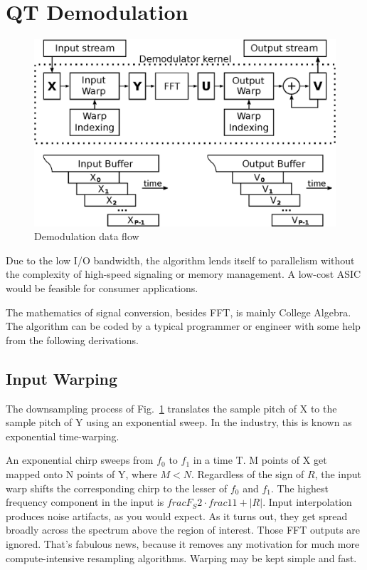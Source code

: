 \section{QT Demodulation}

\begin{figure}
    \centering
    \includegraphics[width=0.95\linewidth]{../source/demod_e}
    \caption[Quantum to Relative Time Demodulation]{Demodulation data flow}
    \label{fig:demod}
\end{figure}

Due to the low I/O bandwidth, the algorithm lends itself to parallelism without
the complexity of high-speed signaling or memory management.
A low-cost ASIC would be feasible for consumer applications.

The mathematics of signal conversion, besides FFT, is mainly College Algebra.
The algorithm can be coded by a typical programmer or engineer with some help
from the following derivations.

\subsection{Input Warping}

The downsampling process of Fig.~\ref{fig:demod} translates the sample pitch of
X to the sample pitch of Y using an exponential sweep.
In the industry, this is known as exponential time-warping.

An exponential chirp sweeps from $f_0$ to $f_1$ in a time T.
M points of X get mapped onto N points of Y, where $M < N$.
Regardless of the sign of $R$, the input warp shifts the corresponding chirp
to the lesser of $f_0$ and $f_1$. The highest frequency component in the input
is $frac{F_S}{2} \cdot frac{1}{1 + |R|}$. Input interpolation produces noise
artifacts, as you would expect. 
As it turns out, they get spread broadly across the spectrum above the region of
interest. Those FFT outputs are ignored.
That's fabulous news, because it removes any motivation for much more
compute-intensive resampling algorithms. Warping may be kept simple and fast.

